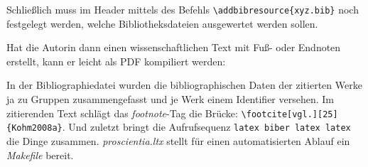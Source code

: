 Schließlich muss im Header mittels des Befehls \texttt{\textbackslash{}addbibresource\{xyz.bib\}} noch festgelegt werden, welche Bibliotheksdateien ausgewertet werden sollen.

Hat die Autorin dann einen wissenschaftlichen Text mit Fuß- oder Endnoten erstellt, kann er leicht als PDF kompiliert werden:

In der Bibliographiedatei wurden die bibliographischen Daten der zitierten Werke ja zu Gruppen zusammengefasst und je Werk einem Identifier versehen. Im zitierenden Text schlägt das \emph{footnote}-Tag die Brücke: \texttt{\textbackslash{}footcite[vgl.][25]\{Kohm2008a\}}. Und zuletzt bringt die Aufrufsequenz \texttt{latex biber latex latex} die Dinge zusammen. \emph{proscientia.ltx} stellt für einen automatisierten Ablauf ein \emph{Makefile} bereit.
